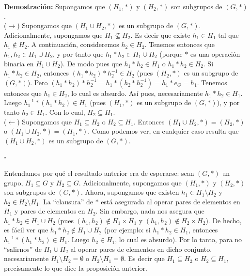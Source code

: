 \documentclass[10 pt]{article}
\begin{document}
\Large{\textbf{Demostración:} Supongamos que $(H_1,*)$ y $(H_2,*)$ son subgrupos de $(G,*)$. \\

($\rightarrow$) Supongamos que $(H_1 \cup H_2,*)$ es un subgrupo de $(G,*)$. Adicionalmente, supongamos que $H_1 \nsubseteq H_2$. Es decir que existe $h_1 \in H_1$ tal que $h_1 \notin H_2$. A continuación, consideremos $h_2 \in H_2$. Tenemos entonces que $h_1,h_2 \in H_1 \cup H_2$, y por tanto que $h_1*h_2 \in H_1 \cup H_2$ (porque $*$ es una operación binaria en $H_1 \cup H_2$). De modo pues que $h_1*h_2 \in H_1$ o $h_1*h_2 \in H_2$. Si $h_1*h_2 \in H_2$, entonces $(h_1*h_2)*h_2^{-1} \in H_2$ (pues $(H_2,*)$ es un subgrupo de $(G,*)$). Pero $(h_1*h_2)*h_2^{-1}=h_1*(h_2*h_2^{-1})=h_1*e_G=h_1$. Tenemos entonces que $h_1 \in  H_2$, lo cual es absurdo. Así pues, necesariamente $h_1*h_2 \in H_1$. Luego $h_1^{-1}*(h_1*h_2) \in H_1$ (pues $(H_1,*)$ es un subgrupo de $(G,*)$), y por tanto $h_2 \in H_1$. Con lo cual, $H_2 \subseteq H_1$. \\

($\leftarrow$) Supongamos que $H_1 \subseteq H_2$ o $H_2 \subseteq H_1$. Entonces $(H_1 \cup H_2,*)=(H_2,*)$ o $(H_1 \cup H_2,*)=(H_1,*)$. Como podemos ver, en cualquier caso resulta que $(H_1 \cup H_2,*)$ es un subgrupo de $(G,*)$.} \\

\begin{flushright}
    $\square$
\end{flushright}

\Large{Entendamos por qué el resultado anterior era de esperarse: sean $(G,*)$ un grupo, $H_1 \subseteq G$ y $H_2 \subseteq G$. Adicionalmente, supongamos que $(H_1,*)$ y $(H_2,*)$ son subgrupos de $(G,*)$. Ahora, supongamos que existen $h_1 \in H_1 \setminus H_2$ y $h_2 \in H_2 \setminus H_1$. La ``clausura'' de $*$ está asegurada al operar pares de elementos en $H_1$ y pares de elementos en $H_2$. Sin embargo, nada nos asegura que $h_1*h_2 \in H_1 \cup H_2$ (pues $(h_1,h_2) \notin H_1 \times H_1$ y $(h_1,h_2) \notin H_2 \times H_2$). De hecho, es fácil ver que $h_1*h_2 \notin H_1 \cup H_2$ (por ejemplo: si $h_1*h_2 \in H_1$, entonces $h_1^{-1}*(h_1*h_2) \in H_1$. Luego $h_2 \in H_1$, lo cual es absurdo). Por lo tanto, para no ``salirnos'' de $H_1 \cup H_2$ al operar pares de elementos en dicho conjunto, necesariamente $H_1 \setminus H_2=\emptyset$ o $H_2 \setminus H_1=\emptyset$. Es decir que $H_1 \subseteq H_2$ o $H_2 \subseteq H_1$, precisamente lo que dice la proposición anterior.} \\
\end{document}
